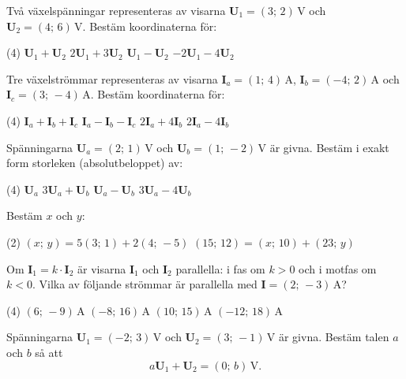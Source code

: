 Två växelspänningar representeras av visarna $\mathbf{U}_1 = (3;\, 2)\,\text{V}$ och $\mathbf{U}_2
= (4;\, 6)\,\text{V}$. Bestäm koordinaterna för:
\begin{delar}(4)
  \task $\mathbf{U}_1 + \mathbf{U}_2$
  \task $2\mathbf{U}_1 + 3\mathbf{U}_2$
  \task $\mathbf{U}_1 - \mathbf{U}_2$
  \task $-2\mathbf{U}_1 - 4\mathbf{U}_2$
\end{delar}

Tre växelströmmar representeras av visarna $\mathbf{I}_a = (1;\, 4)\,\text{A}$, $\mathbf{I}_b =
(-4;\, 2)\,\text{A}$ och $\mathbf{I}_c = (3;\, -4)\,\text{A}$. Bestäm koordinaterna för:
\begin{delar}(4)
  \task $\mathbf{I}_a + \mathbf{I}_b + \mathbf{I}_c$
  \task $\mathbf{I}_a - \mathbf{I}_b - \mathbf{I}_c$
  \task $2\mathbf{I}_a + 4\mathbf{I}_b$
  \task $2\mathbf{I}_a - 4\mathbf{I}_b$
\end{delar}

Spänningarna $\mathbf{U}_a = (2;\, 1)\,\text{V}$ och $\mathbf{U}_b = (1;\, -2)\,\text{V}$ är
givna. Bestäm i exakt form storleken (absolutbeloppet) av:
\begin{delar}(4)
  \task $\mathbf{U}_a$
  \task $3\mathbf{U}_a + \mathbf{U}_b$
  \task $\mathbf{U}_a - \mathbf{U}_b$
  \task $3\mathbf{U}_a - 4\mathbf{U}_b$
\end{delar}

Bestäm $x$ och $y$:
\begin{delar}(2)
  \task $(x;\, y) = 5(3;\, 1) + 2(4;\, -5)$
  \task $(15;\, 12) = (x;\, 10) + (23;\, y)$
\end{delar}

Om $\mathbf{I}_1 = k \cdot \mathbf{I}_2$ är visarna $\mathbf{I}_1$ och $\mathbf{I}_2$ parallella:
i fas om $k > 0$ och i motfas om $k < 0$. Vilka av följande strömmar är parallella med $\mathbf{I}
= (2;\, -3)\,\text{A}$?
\begin{delar}(4)
  \task $(6;\, -9)\,\text{A}$
  \task $(-8;\, 16)\,\text{A}$
  \task $(10;\, 15)\,\text{A}$
  \task $(-12;\, 18)\,\text{A}$
\end{delar}

Spänningarna $\mathbf{U}_1 = (-2;\, 3)\,\text{V}$ och $\mathbf{U}_2 = (3;\, -1)\,\text{V}$ är
givna. Bestäm talen $a$ och $b$ så att
\[
  a\mathbf{U}_1 + \mathbf{U}_2 = (0;\, b)\,\text{V}.
\]

